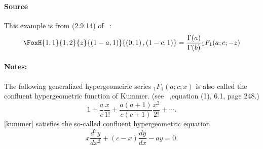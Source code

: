 \paragraph{Source} This example is from (2.9.14) of
~\cite{kilbas.saigo:04:h-transforms}:
\begin{align*}
  \FoxH
    {1,1}
    {1,2}
    {z}
    {\left(1-a, 1\right)}
    {\left(0, 1\right), \left(1-c, 1\right)}=\frac{\Gamma(a)}{\Gamma(b)}{}_1F_1(a;c;-z)
\end{align*}
\paragraph{Notes:}
The following generalized hypergeomeiric series ${}_1F_1(a;c;x)$ is also called the confluent hypergeometric function of Kummer. (see ~\cite{erdelyi.magnus.ea:81:higher*1},equation (1), 6.1, page 248.) 
\begin{equation}\label{kummer} 
1+ \frac{a}{c}\frac{x}{1!} + \frac{a(a+1)}{c(c+1)}\frac{x^2}{2!} + \cdots .
\end{equation}
\eqref{kummer} satisfies the so-called confluent hypergeometric equation
$$ x \frac{d^2 y}{d x^2}+(c-x) \frac{d y}{d x}-a y=0.$$


